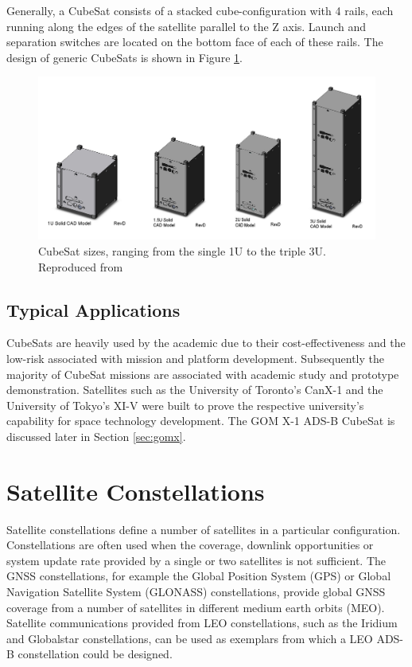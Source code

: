 Generally, a CubeSat consists of a stacked cube-configuration with 4 rails, each running along the edges of the satellite parallel to the Z axis. Launch and separation switches are located on the bottom face of each of these rails. The design of generic CubeSats is shown in Figure \ref{fig:cubesat_sizes}.

\begin{figure}[htb]
	\centering
	\includegraphics[scale = 0.25]{Pictures/cubesat_sizes.png}
	
	\caption[CubeSat sizes, ranging from the single 1U to the triple 3U]{CubeSat sizes, ranging from the single 1U to the triple 3U. Reproduced from \cite{CubeSatKit2013}}
	\label{fig:cubesat_sizes}
\end{figure}

\subsection{Typical Applications}
CubeSats are heavily used by the academic due to their cost-effectiveness and the low-risk associated with mission and platform development. Subsequently the majority of CubeSat missions are associated with academic study and prototype demonstration. Satellites such as the University of Toronto's CanX-1 \cite{CanX-1} and the University of Tokyo's XI-V \cite{XI-V} were built to prove the respective university's capability for space technology development. The GOM X-1 ADS-B CubeSat is discussed later in Section \ref{sec:gomx}.

\newpage
\section{Satellite Constellations}
Satellite constellations define a number of satellites in a particular configuration. Constellations are often used when the coverage, downlink opportunities or system update rate provided by a single or two satellites is not sufficient. The GNSS constellations, for example the  Global Position System (GPS) or Global Navigation Satellite System (GLONASS) constellations, provide global GNSS coverage from a number of satellites in different medium earth orbits (MEO). Satellite communications provided from LEO constellations, such as the Iridium and Globalstar constellations, can be used as exemplars from which a LEO ADS-B constellation could be designed.

